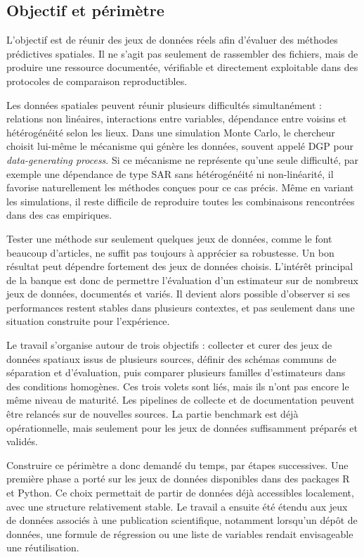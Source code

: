 \documentclass[11pt,a4paper]{article}
\begin{document}
\subsection{Objectif et périmètre}

L'objectif est de réunir des jeux de données réels afin d'évaluer des méthodes prédictives spatiales. Il ne s'agit pas seulement de rassembler des fichiers, mais de produire une ressource documentée, vérifiable et directement exploitable dans des protocoles de comparaison reproductibles.

Les données spatiales peuvent réunir plusieurs difficultés simultanément : relations non linéaires, interactions entre variables, dépendance entre voisins et hétérogénéité selon les lieux. Dans une simulation Monte Carlo, le chercheur choisit lui-même le mécanisme qui génère les données, souvent appelé DGP pour \textit{data-generating process}. Si ce mécanisme ne représente qu'une seule difficulté, par exemple une dépendance de type SAR sans hétérogénéité ni non-linéarité, il favorise naturellement les méthodes conçues pour ce cas précis. Même en variant les simulations, il reste difficile de reproduire toutes les combinaisons rencontrées dans des cas empiriques.

Tester une méthode sur seulement quelques jeux de données, comme le font beaucoup d'articles, ne suffit pas toujours à apprécier sa robustesse. Un bon résultat peut dépendre fortement des jeux de données choisis. L'intérêt principal de la banque est donc de permettre l'évaluation d'un estimateur sur de nombreux jeux de données, documentés et variés. Il devient alors possible d'observer si ses performances restent stables dans plusieurs contextes, et pas seulement dans une situation construite pour l'expérience.

Le travail s'organise autour de trois objectifs : collecter et curer des jeux de données spatiaux issus de plusieurs sources, définir des schémas communs de séparation et d'évaluation, puis comparer plusieurs familles d'estimateurs dans des conditions homogènes. Ces trois volets sont liés, mais ils n'ont pas encore le même niveau de maturité. Les pipelines de collecte et de documentation peuvent être relancés sur de nouvelles sources. La partie benchmark est déjà opérationnelle, mais seulement pour les jeux de données suffisamment préparés et validés.

Construire ce périmètre a donc demandé du temps, par étapes successives. Une première phase a porté sur les jeux de données disponibles dans des packages R et Python. Ce choix permettait de partir de données déjà accessibles localement, avec une structure relativement stable. Le travail a ensuite été étendu aux jeux de données associés à une publication scientifique, notamment lorsqu'un dépôt de données, une formule de régression ou une liste de variables rendait envisageable une réutilisation.
\end{document}
